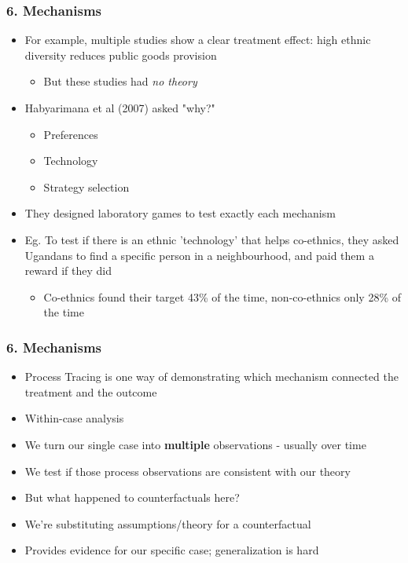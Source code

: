 \documentclass[xcolor=x11names,compress]{beamer}\usepackage[]{graphicx}\usepackage[]{xcolor}
\renewcommand{\(}{\begin{columns}}
\renewcommand{\)}{\end{columns}}
\newcommand{\<}[1]{\begin{column}{#1}}
\renewcommand{\>}{\end{column}}
\begin{document}
\begin{frame}
\frametitle{6. Mechanisms}
\begin{itemize}
\item For example, multiple studies show a clear treatment effect: high ethnic diversity reduces public goods provision
\pause
\begin{itemize}
\item But these studies had \textit{no theory}
\pause
\end{itemize}
\item Habyarimana et al (2007) asked "why?"
\pause
\begin{itemize}
\item Preferences
\item Technology
\item Strategy selection
\pause
\end{itemize}
\item They designed laboratory games to test exactly each mechanism
\pause
\item Eg. To test if there is an ethnic 'technology' that helps co-ethnics, they asked Ugandans to find a specific person in a neighbourhood, and paid them a reward if they did
\pause
\begin{itemize}
\item Co-ethnics found their target 43\% of the time, non-co-ethnics only 28\% of the time
\end{itemize}
\end{itemize}
\end{frame}

\begin{frame}
\frametitle{6. Mechanisms}
\begin{itemize}
\item Process Tracing is one way of demonstrating which mechanism connected the treatment and the outcome 
\pause
\item Within-case analysis
\pause
\item We turn our single case into \textbf{multiple} observations - usually over time
\pause
\item We test if those process observations are consistent with our theory
\pause
\item But what happened to counterfactuals here? 
\pause
\item We're substituting assumptions/theory for a counterfactual
\pause
\item Provides evidence for our specific case; generalization is hard
\end{itemize}
\end{frame}
\end{document}
